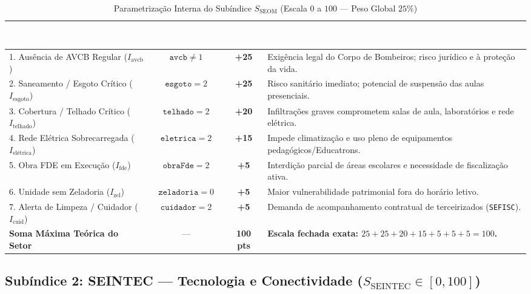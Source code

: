 \documentclass[9pt,a4paper]{extarticle}
\begin{document}
\begin{table}[h!]
\centering
\footnotesize
\renewcommand{\arraystretch}{1.22}
\caption{Parametrização Interna do Subíndice $S_{\text{SEOM}}$ (Escala $0$ a $100$ --- Peso Global $25\%$)}
\begin{tabularx}{\textwidth}{p{4.2cm} c c X}
\toprule
\rowcolor{ureNavy} \textcolor{white}{\textbf{Fator de Risco Predial (SEOM)}} & \textcolor{white}{\textbf{Condição Lógica}} & \textcolor{white}{\textbf{Pontos}} & \textcolor{white}{\textbf{Justificativa Técnica de Engenharia e Segurança}} \\
\midrule
1. Ausência de AVCB Regular ($I_{\text{avcb}}$) & $\texttt{avcb} \neq 1$ & \textbf{+25} & Exigência legal do Corpo de Bombeiros; risco jurídico e à proteção da vida. \\
\rowcolor{ureLight} 2. Saneamento / Esgoto Crítico ($I_{\text{esgoto}}$) & $\texttt{esgoto} = 2$ & \textbf{+25} & Risco sanitário imediato; potencial de suspensão das aulas presenciais. \\
3. Cobertura / Telhado Crítico ($I_{\text{telhado}}$) & $\texttt{telhado} = 2$ & \textbf{+20} & Infiltrações graves comprometem salas de aula, laboratórios e rede elétrica. \\
\rowcolor{ureLight} 4. Rede Elétrica Sobrecarregada ($I_{\text{elétrica}}$) & $\texttt{eletrica} = 2$ & \textbf{+15} & Impede climatização e uso pleno de equipamentos pedagógicos/Educatrons. \\
5. Obra FDE em Execução ($I_{\text{fde}}$) & $\texttt{obraFde} = 2$ & \textbf{+5} & Interdição parcial de áreas escolares e necessidade de fiscalização ativa. \\
\rowcolor{ureLight} 6. Unidade sem Zeladoria ($I_{\text{zel}}$) & $\texttt{zeladoria} = 0$ & \textbf{+5} & Maior vulnerabilidade patrimonial fora do horário letivo. \\
7. Alerta de Limpeza / Cuidador ($I_{\text{cuid}}$) & $\texttt{cuidador} = 2$ & \textbf{+5} & Demanda de acompanhamento contratual de terceirizados (\texttt{SEFISC}). \\
\midrule
\rowcolor{ureLight} \textbf{Soma Máxima Teórica do Setor} & --- & \textbf{100 pts} & \textbf{Escala fechada exata: $25+25+20+15+5+5+5 = 100$.} \\
\bottomrule
\end{tabularx}
\end{table}

\subsection{Subíndice 2: SEINTEC --- Tecnologia e Conectividade ($S_{\text{SEINTEC}} \in [0, 100]$)}
\end{document}
